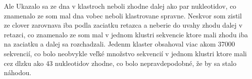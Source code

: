 Ale Ukazalo sa ze dna v klastroch neboli zhodne dalej ako par nukleotidov, co znamenalo ze som mal dna vobec neboli klastrovane spravne.
Neskvor som zistil ze clover zarovnava iba podla zaciatku retazca a neberie do uvahy zhodu dalej v retazci, co znamenalo ze som mal v jednom klustri sekvencie ktore mali zhodu iba na zaciatku a dalej sa rozchadzali.
Jedenm klaster obsahoval viac akom 37000 sekvencií, co bolo neobvykle veľké množstvo sekvencií v jednom klustri ktore mali cez dlzku ako 43 nukleotidov zhodne, co bolo nepravdepodobné, že by sa stalo náhodou.
